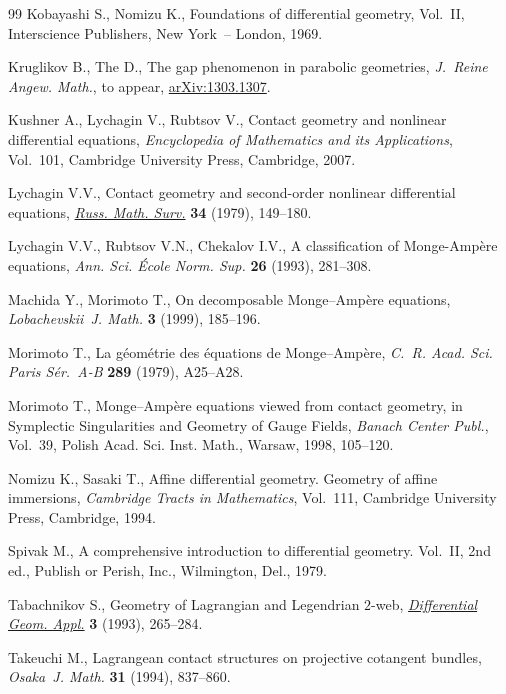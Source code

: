 \documentclass[pdftex]{sigma}
\begin{document}
\begin{thebibliography}{99}
Kobayashi S., Nomizu K., Foundations of dif\/ferential geometry, {V}ol.~{II},
  Interscience Publishers, New York~-- London, 1969.

Kruglikov B., The D., The gap phenomenon in parabolic geometries,
  \textit{J.~Reine Angew. Math.}, {t}o appear, \href{http://arxiv.org/abs/1303.1307}{arXiv:1303.1307}.

Kushner A., Lychagin V., Rubtsov V., Contact geometry and nonlinear
  dif\/ferential equations, \textit{Encyclopedia of Mathematics and its
  Applications}, Vol.~101, Cambridge University Press, Cambridge, 2007.

Lychagin V.V., Contact geometry and second-order nonlinear dif\/ferential
  equations, \href{http://dx.doi.org/10.1070/RM1979v034n01ABEH002873}{\textit{Russ. Math. Surv.}} \textbf{34} (1979), 149--180.

Lychagin V.V., Rubtsov V.N., Chekalov I.V., A classif\/ication of
  {M}onge-{A}mp\`ere equations, \textit{Ann. Sci. \'Ecole Norm. Sup.}
  \textbf{26} (1993), 281--308.

Machida Y., Morimoto T., On decomposable {M}onge--{A}mp\`ere equations,
  \textit{Lobachevskii~J. Math.} \textbf{3} (1999), 185--196.

Morimoto T., La g\'eom\'etrie des \'equations de {M}onge--{A}mp\`ere,
  \textit{C.~R. Acad. Sci. Paris S\'er.~A-B} \textbf{289} (1979), A25--A28.

Morimoto T., Monge--Amp{\`e}re equations viewed from contact geometry, in
  Symplectic Singularities and Geometry of Gauge Fields, \textit{Banach Center
  Publ.}, Vol.~39, Polish Acad. Sci. Inst. Math., Warsaw, 1998, 105--120.

Nomizu K., Sasaki T., Af\/f\/ine dif\/ferential geometry. Geometry of af\/f\/ine
  immersions, \textit{Cambridge Tracts in Mathematics}, Vol.~111, Cambridge
  University Press, Cambridge, 1994.

Spivak M., A comprehensive introduction to dif\/ferential geometry. {V}ol.~{II},
  2nd ed., Publish or Perish, Inc., Wilmington, Del., 1979.

Tabachnikov S., Geometry of {L}agrangian and {L}egendrian {$2$}-web,
  \href{http://dx.doi.org/10.1016/0926-2245(93)90004-K}{\textit{Differential Geom. Appl.}} \textbf{3} (1993), 265--284.

Takeuchi M., Lagrangean contact structures on projective cotangent bundles,
  \textit{Osaka~J. Math.} \textbf{31} (1994), 837--860.


\end{thebibliography}
\end{document}
